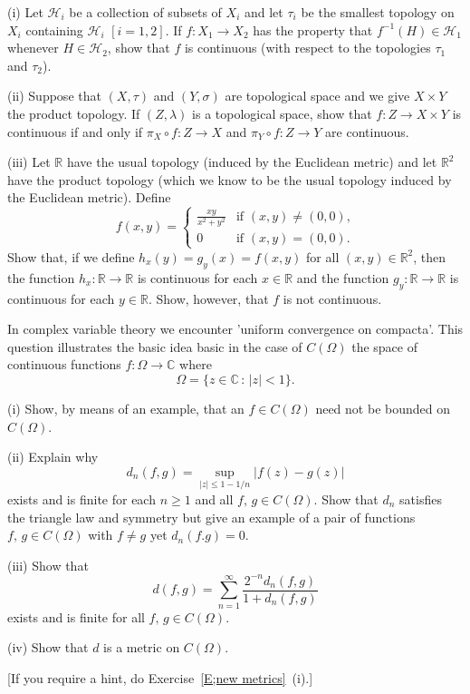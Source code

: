 \begin{problem} (i) Let ${\mathcal H}_{i}$ be a collection of
subsets of $X_{i}$ and let $\tau_{i}$ be the smallest topology
on $X_{i}$ containing ${\mathcal H}_{i}$ $[i=1,2]$. If
$f:X_{1}\rightarrow X_{2}$ has the property that
$f^{-1}(H)\in {\mathcal H}_{1}$ whenever $H\in{\mathcal H}_{2}$,
show that $f$ is continuous
(with respect to the topologies $\tau_{1}$ and $\tau_{2}$).

(ii) Suppose that $(X,\tau)$ and $(Y,\sigma)$ are topological
space and we give $X\times Y$ the product topology.
If $(Z,\lambda)$ is a topological space, show that
$f:Z\rightarrow X\times Y$ is continuous if and only
if $\pi_{X}\circ f:Z\rightarrow X$ and
$\pi_{Y}\circ f:Z\rightarrow Y$ are continuous.

(iii) Let ${\mathbb R}$ have the usual topology (induced
by the Euclidean metric) and let ${\mathbb R}^{2}$
have the product topology (which we know to be
the usual topology induced by the Euclidean metric).
Define
\[
f(x,y)=
\begin{cases}
\frac{xy}{x^{2}+y^{2}}&\text{if $(x,y)\neq (0,0)$,}\\
0&\text{if $(x,y)=(0,0)$.}
\end{cases}
\]
Show that, if we define $h_{x}(y)=g_{y}(x)=f(x,y)$
for all $(x,y)\in{\mathbb R}^{2}$, then the function
$h_{x}:{\mathbb R}\rightarrow{\mathbb R}$ is continuous
for each $x\in{\mathbb R}$ and the function
$g_{y}:{\mathbb R}\rightarrow{\mathbb R}$ is continuous
for each $y\in{\mathbb R}$. Show, however, that $f$ is not
continuous.

\end{problem}
\begin{problem} In complex variable theory we encounter
'uniform convergence on compacta'. This question
illustrates the basic idea basic in the case of
$C(\Omega)$ the space of continuous
functions $f:\Omega\rightarrow{\mathbb C}$
where
\[\Omega=\{z\in{\mathbb C}\,:\,|z|<1\}.\]

(i) Show, by means of an example, that an $f\in C(\Omega)$
need not be bounded on $C(\Omega)$.

(ii) Explain why
\[d_{n}(f,g)=\sup_{|z|\leq 1-1/n}|f(z)-g(z)|\]
exists and is finite for each $n\geq 1$ and all
$f,\,g\in C(\Omega)$. Show that $d_{n}$ satisfies the
triangle law and symmetry but give an example of
a pair of functions
$f,\,g\in C(\Omega)$ with $f\neq g$ yet $d_{n}(f.g)=0$.

(iii) Show that
\[d(f,g)=\sum_{n=1}^{\infty}\frac{2^{-n}d_{n}(f,g)}{1+d_{n}(f,g)}\]
exists and is finite for all
$f,\,g\in C(\Omega)$.

(iv) Show that $d$ is a metric on $C(\Omega)$.

[If you require a hint, do Exercise~\ref{E;new metrics}~(i).]
\end{problem}
